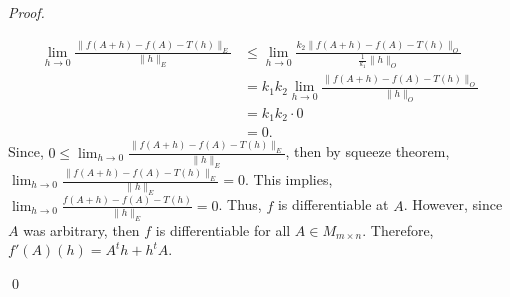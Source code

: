 \documentclass[12pt]{article}
\newenvironment{sol}
    {\emph{Proof.}
    }
    {
    \qed
    }
\begin{document}
\begin{sol}
\begin{align*}
      \lim_{h \to 0} \frac{\lVert f(A+h) - f(A) - T(h) \rVert_E}{\lVert h \rVert_E} &\leq \lim_{h \to 0} \frac{k_2 \lVert f(A+h) - f(A) - T(h) \rVert_O}{\frac{1}{k_1}\lVert h \rVert_O} \tag*{(By comparability of $\lVert \cdot \rVert_E$ and $\lVert \cdot \rVert_O$)} \\ &= k_1k_2 \lim_{h \to 0} \frac{\lVert f(A+h) - f(A) - T(h) \rVert_O}{\lVert h \rVert_O} \tag*{(Property of limits)} \\ &= k_1k_2 \cdot 0 \\ &= 0.
  \end{align*}
  Since, $0 \leq \lim_{h \to 0} \frac{\lVert f(A+h) - f(A) - T(h) \rVert_E}{\lVert h \rVert_E}$, then by squeeze theorem, $\lim_{h \to 0} \frac{\lVert f(A+h) - f(A) - T(h) \rVert_E}{\lVert h \rVert_E} = 0$. This implies, $\lim_{h \to 0} \frac{f(A+h) - f(A) - T(h)}{\lVert h \rVert_E} = 0$. Thus, $f$ is differentiable at $A$. However, since $A$ was arbitrary, then $f$ is differentiable for all $A \in M_{m \times n}$. Therefore, $f'(A)(h) = A^th + h^tA$.
  \end{sol}
  
\end{document}
